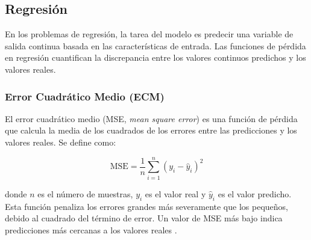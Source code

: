 \subsection{Regresión}

En los problemas de regresión, la tarea del modelo es predecir una variable de salida continua basada en las características de entrada. Las funciones de pérdida en regresión cuantifican la discrepancia entre los valores continuos predichos y los valores reales.

\subsubsection{Error Cuadrático Medio (ECM)}

El error cuadrático medio (MSE, \textit{mean square error}) es una función de pérdida que calcula la media de los cuadrados de los errores entre las predicciones y los valores reales. Se define como:

\begin{equation}
    \text{MSE} = \frac{1}{n} \sum_{i=1}^{n} (y_i - \hat{y}_i)^2
\end{equation}

donde \(n\) es el número de muestras, \(y_i\) es el valor real y \(\hat{y}_i\) es el valor predicho. Esta función penaliza los errores grandes más severamente que los pequeños, debido al cuadrado del término de error. Un valor de MSE más bajo indica predicciones más cercanas a los valores reales \cite{pajares2021aprendizaje}.

